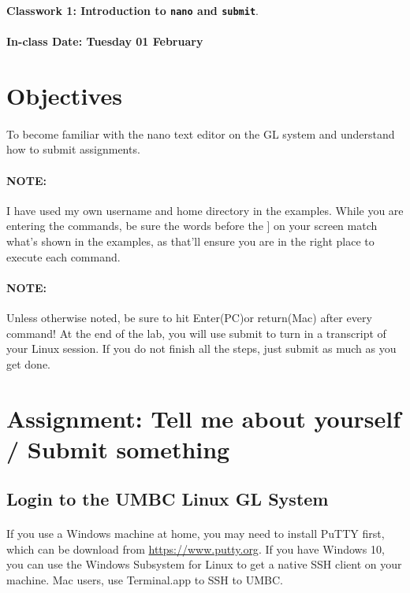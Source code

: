 \documentclass[letter,11pt]{article}
\begin{document}
\huge
\textbf{Classwork 1: Introduction to \texttt{nano} and \texttt{submit}}.
\normalsize
\\ ~~ \\
\textbf{In-class Date: Tuesday 01 February}

\section*{Objectives}
\paragraph{}To become familiar with the nano text editor on the GL system and understand how to submit assignments.

\paragraph{NOTE:} I have used my own username and home directory in the examples. While you are entering the commands, be sure the words before the ] on your screen match what’s shown in the examples, as that’ll ensure you are in the right place to execute each command.

\paragraph{NOTE:} Unless otherwise noted, be sure to hit Enter(PC)or return(Mac) after every command! At the end of the lab, you will use submit to turn in a transcript of your Linux session. If you do not finish all the steps, just submit as much as you get done.

\section*{Assignment: Tell me about yourself / Submit something}
\subsection{Login to the UMBC Linux GL System}
\paragraph{}If you use a Windows machine at home, you may need to install PuTTY first, which can be download from \url{https://www.putty.org}. If you have Windows 10, you can use the Windows Subsystem for Linux to get a native SSH client on your machine. Mac users, use Terminal.app to SSH to UMBC.
\end{document}

